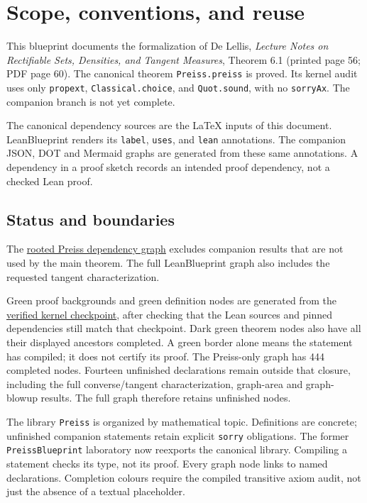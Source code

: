 



\chapter{Scope, conventions, and reuse}

This blueprint documents the formalization of De Lellis, \emph{Lecture Notes on Rectifiable Sets,
Densities, and Tangent Measures}, Theorem 6.1 (printed page 56; PDF page 60).
The canonical theorem \texttt{Preiss.preiss} is proved. Its kernel audit uses
only \texttt{propext}, \texttt{Classical.choice}, and \texttt{Quot.sound}, with
no \texttt{sorryAx}. The companion branch is not yet complete.

The canonical dependency sources are the LaTeX inputs of this document. LeanBlueprint renders its
\texttt{label}, \texttt{uses}, and \texttt{lean} annotations. The companion JSON,
DOT and Mermaid graphs are generated from these same annotations. A dependency
in a proof sketch records an intended proof dependency, not a checked Lean proof.

\section{Status and boundaries}
The \href{preiss-core.svg}{rooted Preiss dependency graph} excludes companion
results that are not used by the main theorem. The full LeanBlueprint graph
also includes the requested tangent characterization.

Green proof backgrounds and green definition nodes are generated from the
\href{proof-status.html}{verified kernel checkpoint}, after checking that the
Lean sources and pinned dependencies still match that checkpoint. Dark green
theorem nodes also have all their displayed ancestors completed. A green border
alone means the statement has compiled; it does not certify its proof.
The Preiss-only graph has 444 completed nodes. Fourteen unfinished declarations
remain outside that closure, including the full converse/tangent characterization,
graph-area and graph-blowup results. The full graph therefore retains unfinished nodes.

The library \texttt{Preiss} is organized by mathematical topic. Definitions
are concrete; unfinished companion statements retain explicit \texttt{sorry}
obligations. The former \texttt{PreissBlueprint} laboratory now reexports the
canonical library. Compiling a statement checks its type, not its proof.
Every graph node links to named declarations. Completion colours require the
compiled transitive axiom audit, not just the absence of a textual placeholder.

